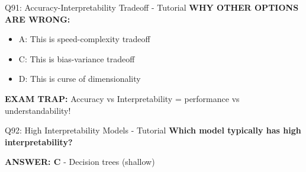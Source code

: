 \documentclass[8pt]{beamer}
\begin{document}
\begin{frame}{Q91: Accuracy-Interpretability Tradeoff - Tutorial}
		\vspace{0.05cm}
		\textcolor{myred}{\textbf{WHY OTHER OPTIONS ARE WRONG:}}
		\begin{itemize}
			\item \textcolor{myred}{A:} This is speed-complexity tradeoff
			\item \textcolor{myred}{C:} This is bias-variance tradeoff
			\item \textcolor{myred}{D:} This is curse of dimensionality
		\end{itemize}
		
		\textcolor{myred}{\textbf{EXAM TRAP:}} Accuracy vs Interpretability = performance vs understandability!
	\end{frame}
	
	\begin{frame}{Q92: High Interpretability Models - Tutorial}
		\fontsize{6.5}{7.5}\selectfont
		\textbf{Which model typically has high interpretability?}
		
		\vspace{0.05cm}
		\textcolor{myblue}{\textbf{ANSWER: C}} - Decision trees (shallow)
		

\end{frame}
\end{document}
